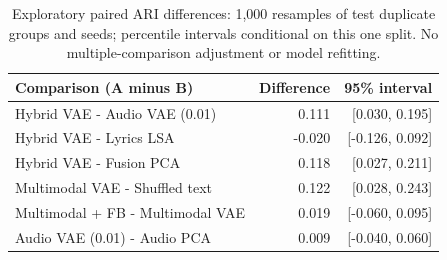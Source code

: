 \begin{table}[htbp]
\centering
\caption{Exploratory paired ARI differences: 1,000 resamples of test duplicate groups and seeds; percentile intervals conditional on this one split. No multiple-comparison adjustment or model refitting.}
\label{tab:bootstrap}
\small
\begin{tabular}{lrr}
\toprule
Comparison (A minus B) & Difference & 95\% interval \\
\midrule
Hybrid VAE - Audio VAE (0.01) & 0.111 & [0.030, 0.195] \\
Hybrid VAE - Lyrics LSA & -0.020 & [-0.126, 0.092] \\
Hybrid VAE - Fusion PCA & 0.118 & [0.027, 0.211] \\
Multimodal VAE - Shuffled text & 0.122 & [0.028, 0.243] \\
Multimodal + FB - Multimodal VAE & 0.019 & [-0.060, 0.095] \\
Audio VAE (0.01) - Audio PCA & 0.009 & [-0.040, 0.060] \\
\bottomrule
\end{tabular}
\end{table}
